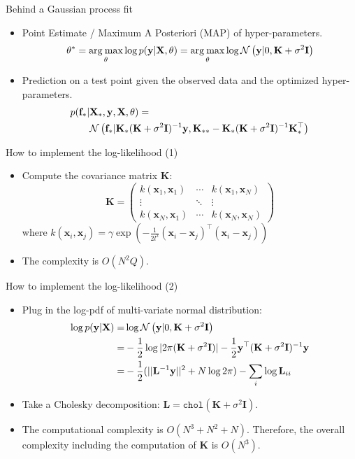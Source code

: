 \documentclass[14pt,aspectratio=1610]{beamer}
\newcommand{\yV}{\mathbf{y}}
\newcommand{\fV}{\mathbf{f}}
\newcommand{\xM}{\mathbf{X}}
\newcommand{\xV}{\mathbf{x}}
\newcommand{\K}{\mathbf{K}}
\renewcommand{\L}{\mathbf{L}}
\newcommand{\I}{\mathbf{I}}
\newcommand{\argmax}{\operatorname*{arg\: max}}
\begin{document}
\begin{frame}{Behind a Gaussian process fit}
\begin{itemize}

\item Point Estimate / Maximum A Posteriori (MAP) of hyper-parameters.
%
\[
\theta^* = \argmax_{\theta} \log p(\yV|\xM, \theta) = \argmax_{\theta} \log \gaussianDist{\yV}{0}{\K+\sigma^2\I}
\]

\item Prediction on a test point given the observed data and the optimized hyper-parameters.
\begin{align*}
p(\fV_* | &\xM_*, \yV, \xM, \theta) = \\
& \gaussianDist{\fV_*}{\K_* (\K+\sigma^2\I)^{-1} \yV}{\K_{**} - \K_* (\K+\sigma^2\I)^{-1} \K_*^\top}
\end{align*}

\end{itemize}
\end{frame}

\begin{frame}{How to implement the log-likelihood (1)}
\begin{itemize}
\item Compute the covariance matrix $\K$:
\[\K = 
 \begin{pmatrix}
  k(\xV_1, \xV_1) & \cdots & k(\xV_1, \xV_N) \\
  \vdots  &  \ddots & \vdots  \\
  k(\xV_N, \xV_1) & \cdots & k(\xV_N, \xV_N) 
 \end{pmatrix}
 \]
where $k(\xV_i, \xV_j) = \gamma \exp\left(-\frac{1}{2l^2}(\xV_i - \xV_j)^\top(\xV_i - \xV_j)\right)$
\vspace{5mm}
\item The complexity is $O(N^2Q)$.
\end{itemize}
\end{frame}

\begin{frame}{How to implement the log-likelihood (2)}
\begin{itemize}
\item Plug in the log-pdf of multi-variate normal distribution:
\begin{align*}
\log p(\yV|\xM) =&  \log \gaussianDist{\yV}{0}{\K+\sigma^2\I}\\
=& -\frac{1}{2}\log |2\pi (\K+\sigma^2\I)| - \frac{1}{2} \yV^\top (\K+\sigma^2\I)^{-1} \yV\\
=& -\frac{1}{2}(||\L^{-1}\yV||^2+N\log 2\pi)-\sum_i \log \L_{ii}
\end{align*}
\item Take a Cholesky decomposition: $\L = \mathtt{chol}(\K+\sigma^2\I )$.
\item The computational complexity is $O(N^3 + N^2 + N)$. Therefore, the overall complexity including the computation of $\K$ is $O(N^3)$.
\end{itemize}
\end{frame}
\end{document}
